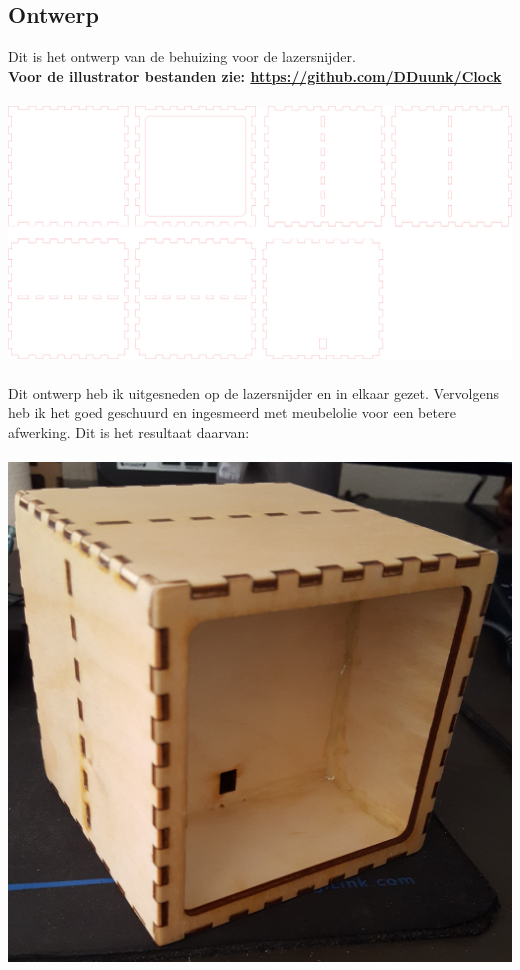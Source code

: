\documentclass[a4paper,12pt]{article}
\begin{document}
\subsection{Ontwerp}
Dit is het ontwerp van de behuizing voor de lazersnijder.
\\
\textbf{Voor de illustrator bestanden zie: \url{https://github.com/DDuunk/Clock} }
\\ \\
\includegraphics[scale=0.4]{klok}
\\ \\
Dit ontwerp heb ik uitgesneden op de lazersnijder en in elkaar gezet.
Vervolgens heb ik het goed geschuurd en ingesmeerd met meubelolie voor een betere afwerking.
Dit is het resultaat daarvan: 
\\ \\
\includegraphics[scale=0.2]{case}
\end{document}
